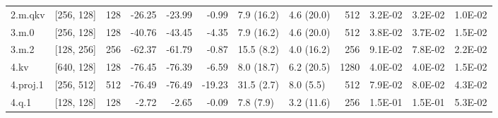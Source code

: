 \begin{table}
\begin{tabular}{llrrrrllrrrr}
2.m.qkv & [256, 128] & 128 & {\cellcolor[HTML]{FECE7C}} \color[HTML]{000000} -26.25 & {\cellcolor[HTML]{FED683}} \color[HTML]{000000} -23.99 & {\cellcolor[HTML]{ECF7A6}} \color[HTML]{000000} -0.99 & 7.9 (16.2) & 4.6 (20.0) & 512 & {\cellcolor[HTML]{E0F295}} \color[HTML]{000000} 3.2E-02 & {\cellcolor[HTML]{E0F295}} \color[HTML]{000000} 3.2E-02 & {\cellcolor[HTML]{BDE379}} \color[HTML]{000000} 1.0E-02 \\
3.m.0 & [256, 128] & 128 & {\cellcolor[HTML]{F99355}} \color[HTML]{000000} -40.76 & {\cellcolor[HTML]{F8864F}} \color[HTML]{F1F1F1} -43.45 & {\cellcolor[HTML]{F5FBB2}} \color[HTML]{000000} -4.35 & 7.9 (16.2) & 4.6 (20.0) & 512 & {\cellcolor[HTML]{E8F59F}} \color[HTML]{000000} 3.8E-02 & {\cellcolor[HTML]{E8F59F}} \color[HTML]{000000} 3.7E-02 & {\cellcolor[HTML]{C5E67E}} \color[HTML]{000000} 1.5E-02 \\
3.m.2 & [128, 256] & 256 & {\cellcolor[HTML]{D83128}} \color[HTML]{F1F1F1} -62.37 & {\cellcolor[HTML]{D93429}} \color[HTML]{F1F1F1} -61.79 & {\cellcolor[HTML]{ECF7A6}} \color[HTML]{000000} -0.87 & 15.5 (8.2) & 4.0 (16.2) & 256 & {\cellcolor[HTML]{FED481}} \color[HTML]{000000} 9.1E-02 & {\cellcolor[HTML]{FEE797}} \color[HTML]{000000} 7.8E-02 & {\cellcolor[HTML]{D1EC86}} \color[HTML]{000000} 2.2E-02 \\
4.kv & [640, 128] & 128 & {\cellcolor[HTML]{A50026}} \color[HTML]{F1F1F1} -76.45 & {\cellcolor[HTML]{A50026}} \color[HTML]{F1F1F1} -76.39 & {\cellcolor[HTML]{FBFDBA}} \color[HTML]{000000} -6.59 & 8.0 (18.7) & 6.2 (20.5) & 1280 & {\cellcolor[HTML]{EBF7A3}} \color[HTML]{000000} 4.0E-02 & {\cellcolor[HTML]{EBF7A3}} \color[HTML]{000000} 4.0E-02 & {\cellcolor[HTML]{C7E77F}} \color[HTML]{000000} 1.5E-02 \\
4.proj.1 & [256, 512] & 512 & {\cellcolor[HTML]{A50026}} \color[HTML]{F1F1F1} -76.49 & {\cellcolor[HTML]{A50026}} \color[HTML]{F1F1F1} -76.49 & {\cellcolor[HTML]{FEE593}} \color[HTML]{000000} -19.23 & 31.5 (2.7) & 8.0 (5.5) & 512 & {\cellcolor[HTML]{FEE695}} \color[HTML]{000000} 7.9E-02 & {\cellcolor[HTML]{FEE593}} \color[HTML]{000000} 8.0E-02 & {\cellcolor[HTML]{EEF8A8}} \color[HTML]{000000} 4.3E-02 \\
4.q.1 & [128, 128] & 128 & {\cellcolor[HTML]{F1F9AC}} \color[HTML]{000000} -2.72 & {\cellcolor[HTML]{F1F9AC}} \color[HTML]{000000} -2.65 & {\cellcolor[HTML]{E9F6A1}} \color[HTML]{000000} -0.09 & 7.8 (7.9) & 3.2 (11.6) & 256 & {\cellcolor[HTML]{EE613E}} \color[HTML]{F1F1F1} 1.5E-01 & {\cellcolor[HTML]{EB5A3A}} \color[HTML]{F1F1F1} 1.5E-01 & {\cellcolor[HTML]{FBFDBA}} \color[HTML]{000000} 5.3E-02 \\

\end{tabular}
\end{table}
